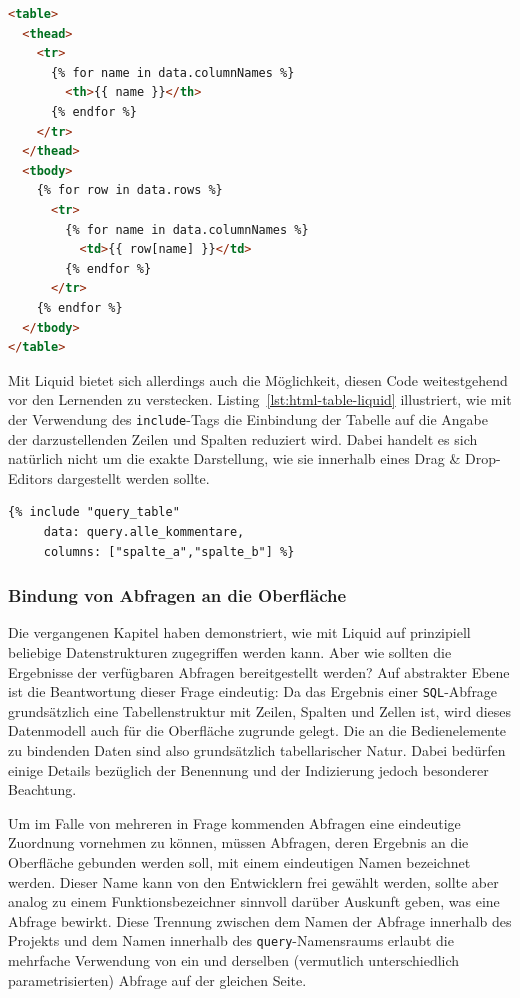 \begin{lstlisting}[language=HTML, float=h, caption={Code für eine \texttt{HTML}-Tabelle mit Datenanbindung}, label={lst:html-table-pure}]
<table>
  <thead>
    <tr>
      {% for name in data.columnNames %}
        <th>{{ name }}</th>
      {% endfor %}
    </tr>
  </thead>
  <tbody>
    {% for row in data.rows %}
      <tr>
        {% for name in data.columnNames %}
          <td>{{ row[name] }}</td>
        {% endfor %}
      </tr>
    {% endfor %}
  </tbody>
</table>
\end{lstlisting}

Mit Liquid bietet sich allerdings auch die Möglichkeit, diesen Code weitestgehend vor den Lernenden zu verstecken. Listing~\ref{lst:html-table-liquid} illustriert, wie mit der Verwendung des \texttt{include}-Tags die Einbindung der Tabelle auf die Angabe der darzustellenden Zeilen und Spalten reduziert wird. Dabei handelt es sich natürlich nicht um die exakte Darstellung, wie sie innerhalb eines Drag \& Drop-Editors dargestellt werden sollte.

\begin{lstlisting}[language=html,float=h,caption={Code für eine Liquid-Tabelle mit Datenanbindung}, label={lst:html-table-liquid}]
{% include "query_table" 
     data: query.alle_kommentare,
     columns: ["spalte_a","spalte_b"] %}
\end{lstlisting}

\subsubsection{Bindung von Abfragen an die Oberfläche}
\label{sec:design-ui-bind-output}

Die vergangenen Kapitel haben demonstriert, wie mit Liquid auf prinzipiell beliebige Datenstrukturen zugegriffen werden kann. Aber wie sollten die Ergebnisse der verfügbaren Abfragen bereitgestellt werden? Auf abstrakter Ebene ist die Beantwortung dieser Frage eindeutig: Da das Ergebnis einer \texttt{SQL}-Abfrage grundsätzlich eine Tabellenstruktur mit Zeilen, Spalten und Zellen ist, wird dieses Datenmodell auch für die Oberfläche zugrunde gelegt. Die an die Bedienelemente zu bindenden Daten sind also grundsätzlich tabellarischer Natur. Dabei bedürfen einige Details bezüglich der Benennung und der Indizierung jedoch besonderer Beachtung.

Um im Falle von mehreren in Frage kommenden Abfragen eine eindeutige Zuordnung vornehmen zu können, müssen Abfragen, deren Ergebnis an die Oberfläche gebunden werden soll, mit einem eindeutigen Namen bezeichnet werden. Dieser Name kann von den Entwicklern frei gewählt werden, sollte aber analog zu einem Funktionsbezeichner sinnvoll darüber Auskunft geben, was eine Abfrage bewirkt. Diese Trennung zwischen dem Namen der Abfrage innerhalb des Projekts und dem Namen innerhalb des \texttt{query}-Namensraums erlaubt die mehrfache Verwendung von ein und derselben (vermutlich unterschiedlich parametrisierten) Abfrage auf der gleichen Seite.

